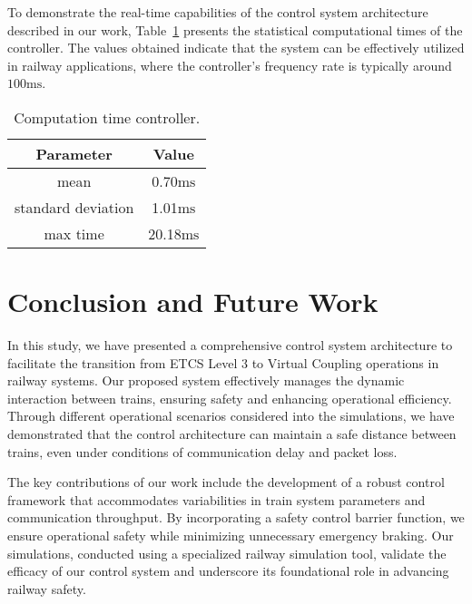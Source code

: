 \documentclass[letterpaper, 10 pt, conference]{ieeeconf}
\theoremstyle{definition}
\theoremstyle{nopoint}
\begin{document}
		
		To demonstrate the real-time capabilities of the control system architecture described in our work, Table~\ref{tab:computationController} presents the statistical computational times of the controller. The values obtained indicate that the system can be effectively utilized in railway applications, where the controller's frequency rate is typically around $100\unit{\milli\second}$.
		\begin{table}[!h]
			\begin{center}
				\caption{Computation time controller.}
				\label{tab:computationController}
				\begin{tabular}{ |c|c| } 
					\hline
					\textbf{Parameter} & \textbf{Value} \\
					\hline
					mean	& 0.70$\unit{\milli\second}$ \\
					standard deviation	& 1.01$\unit{\milli\second}$ \\
					max time	& 20.18$\unit{\milli\second}$ \\
					\hline
				\end{tabular}
			\end{center}
		\end{table}
\section{Conclusion and Future Work}
\label{sec:conclusion}

In this study, we have presented a comprehensive control system architecture to facilitate the transition from ETCS Level 3 to Virtual Coupling operations in railway systems. Our proposed system effectively manages the dynamic interaction between trains, ensuring safety and enhancing operational efficiency. Through different operational scenarios considered into the simulations, we have demonstrated that the control architecture can maintain a safe distance between trains, even under conditions of communication delay and packet loss. 

The key contributions of our work include the development of a robust control framework that accommodates variabilities in train system parameters and communication throughput. By incorporating a safety control barrier function, we ensure operational safety while minimizing unnecessary emergency braking. Our simulations, conducted using a specialized railway simulation tool, validate the efficacy of our control system and underscore its foundational role in advancing railway safety.
\end{document}
